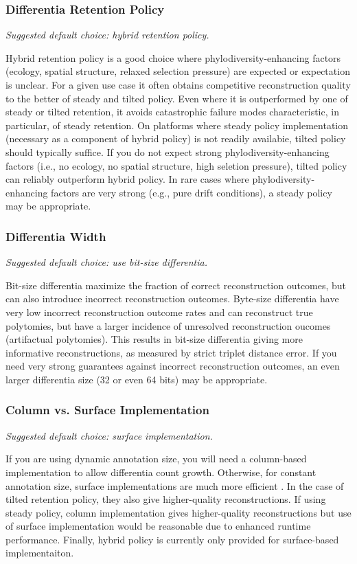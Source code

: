 \subsubsection{Differentia Retention Policy}
\textit{Suggested default choice: hybrid retention policy.}

Hybrid retention policy is a good choice where phylodiversity-enhancing factors (ecology, spatial structure, relaxed selection pressure) are expected or expectation is unclear.
For a given use case it often obtains competitive reconstruction quality to the better of steady and tilted policy.
Even where it is outperformed by one of steady or tilted retention, it avoids catastrophic failure modes characteristic, in particular, of steady retention.
On platforms where steady policy implementation (necessary as a component of hybrid policy) is not readily availabie, tilted policy should typically suffice.
If you do not expect strong phylodiversity-enhancing factors (i.e., no ecology, no spatial structure, high seletion pressure), tilted policy can reliably outperform hybrid policy.
In rare cases where phylodiversity-enhancing factors are very strong (e.g., pure drift conditions), a steady policy may be appropriate.

\subsubsection{Differentia Width}
\textit{Suggested default choice: use bit-size differentia.}

Bit-size differentia maximize the fraction of correct reconstruction outcomes, but can also introduce incorrect reconstruction outcomes.
Byte-size differentia have very low incorrect reconstruction outcome rates and can reconstruct true polytomies, but have a larger incidence of unresolved reconstruction oucomes (artifactual polytomies).
This results in bit-size differentia giving more informative reconstructions, as measured by strict triplet distance error.
If you need very strong guarantees against incorrect reconstruction outcomes, an even larger differentia size (32 or even 64 bits) may be appropriate.

\subsubsection{Column vs. Surface Implementation}
\textit{Suggested default choice: surface implementation.}

If you are using dynamic annotation size, you will need a column-based implementation to allow differentia count growth.
Otherwise, for constant annotation size, surface implementations are much more efficient \citep{moreno2024trackable}.
In the case of tilted retention policy, they also give higher-quality reconstructions.
If using steady policy, column implementation gives higher-quality reconstructions but use of surface implementation would be reasonable due to enhanced runtime performance.
Finally, hybrid policy is currently only provided for surface-based implementaiton.

